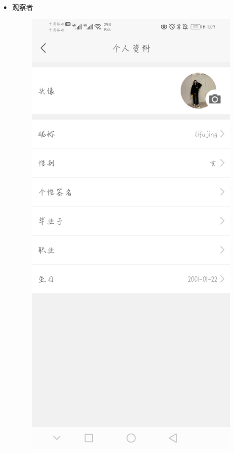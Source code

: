 \documentclass{article}
\begin{document}
\begin{itemize}
   \item 观察者\par
   \begin{figure}[h!]
   	\centering
   	\includegraphics[scale=0.1]{b}
   	\caption{}

\end{figure}
\end{itemize}
\end{document}
